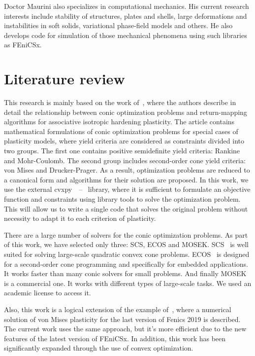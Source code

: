 \documentclass[12pt]{article}
\begin{document}
Doctor Maurini also specializes in computational mechanics. His current research interests include stability of structures, plates and shells, large deformations and instabilities in soft solids, variational phase-field models and others. He also develops code for simulation of those mechanical phenomena using such libraries as FEniCSx.

\newpage
\section{Literature review}

This research is mainly based on the work of~\textcite{BRUNO2020724}, where the authors describe in detail the relationship between conic optimization problems and return-mapping algorithms for associative isotropic hardening plasticity. The article contains mathematical formulations of conic optimization problems for special cases of plasticity models, where yield criteria are considered as constraints divided into two groups. The first one contains positive semidefinite yield criteria: Rankine and Mohr-Coulomb. The second group includes second-order cone yield criteria: von Mises and Drucker-Prager. As a result, optimization problems are reduced to a canonical form and algorithms for their solution are proposed. In this work, we use the external cvxpy~\parencite{diamond2016cvxpy}~--~\parencite{agrawal2018rewriting} library, where it is sufficient to formulate an objective function and constraints using library tools to solve the optimization problem. This will allow us to write a single code that solves the original problem without necessity to adapt it to each criterion of plasticity.

There are a large number of solvers for the conic optimization problems. As part of this work, we have selected only three: SCS, ECOS and MOSEK. SCS~\parencite{ocpb:16} is well suited for solving large-scale quadratic convex cone problems. ECOS~\parencite{Domahidi2013ecos} is designed for a second-order cone programming and specifically for embedded applications. It works faster than many conic solvers for small problems. And finally MOSEK~\parencite{mosek} is a commercial one. It works with different types of large-scale tasks. We used an academic license to access it.

Also, this work is a logical extension of the example of~\textcite{bleyer2018numericaltours}, where a numerical solution of von Mises plasticity for the last version of Fenics 2019 is described. The current work uses the same approach, but it's more efficient due to the new features of the latest version of FEniCSx. In addition, this work has been significantly expanded through the use of convex optimization.
\end{document}
